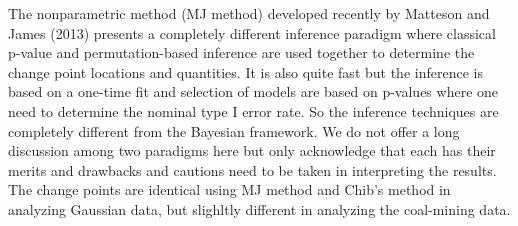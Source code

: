 \documentclass{article}
\begin{document}
The nonparametric method (MJ method) developed recently by Matteson and
James (2013) presents a completely different inference paradigm where
classical p-value and permutation-based inference are used together to
determine the change point locations and quantities. It is also quite
fast but the inference is based on a one-time fit and selection of
models are based on p-values where one need to determine the nominal
type I error rate. So the inference techniques are completely different
from the Bayesian framework. We do not offer a long discussion among two
paradigms here but only acknowledge that each has their merits and
drawbacks and cautions need to be taken in interpreting the results. The
change points are identical using MJ method and Chib's method in
analyzing Gaussian data, but slighltly different in analyzing the
coal-mining data.


    
    
    
    
\end{document}
